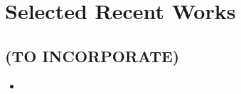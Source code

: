 \chapter{Selected Recent Works}\label{selrecworks}








\begin{unsortedStuff}	
\section*{(TO INCORPORATE)}
	\begin{itemize}
		\item 
	\end{itemize}
\end{unsortedStuff}
		
\begin{optBlankSpace}
	\newpage
	\mbox{}
\end{optBlankSpace}

